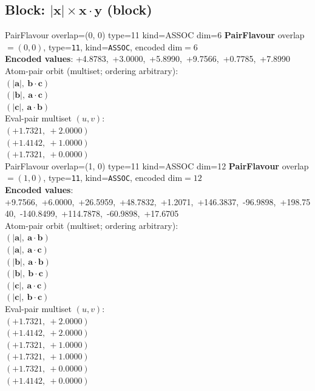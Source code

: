 \documentclass[a4paper,11pt]{article}
\newcommand{\vc}[1]{\ensuremath{\mathbf{#1}}}
\newcommand{\dnfagmiihhiejm}[1]{|\vc{#1}|}
\newcommand{\pdcegfomjfhook}[2]{\mathbf{#1} \cdot \mathbf{#2}}
\begin{document}
\subsection{Block: $\dnfagmiihhiejm{x} \times \pdcegfomjfhook{x}{y}$  (block)}
    PairFlavour  overlap=(0, 0)  type=11  kind=ASSOC  dim=6
\textbf{PairFlavour} overlap$=(0, 0)$, type=\texttt{11}, kind=\texttt{ASSOC}, encoded dim$=6$\\
\textbf{      Encoded values}: +4.8783,\ +3.0000,\ +5.8990,\ +9.7566,\ +0.7785,\ +7.8990\\
\quad Atom-pair orbit (multiset; ordering arbitrary):\\
$(\dnfagmiihhiejm{a},\ \pdcegfomjfhook{b}{c})$\\
$(\dnfagmiihhiejm{b},\ \pdcegfomjfhook{a}{c})$\\
$(\dnfagmiihhiejm{c},\ \pdcegfomjfhook{a}{b})$\\
\quad Eval-pair multiset $(u, v)$:\\
$(+1.7321,\ +2.0000)$\\
$(+1.4142,\ +1.0000)$\\
$(+1.7321,\ +0.0000)$\\
    PairFlavour  overlap=(1, 0)  type=11  kind=ASSOC  dim=12
\textbf{PairFlavour} overlap$=(1, 0)$, type=\texttt{11}, kind=\texttt{ASSOC}, encoded dim$=12$\\
\textbf{      Encoded values}: +9.7566,\ +6.0000,\ +26.5959,\ +48.7832,\ +1.2071,\ +146.3837,\ -96.9898,\ +198.7540,\ -140.8499,\ +114.7878,\ -60.9898,\ +17.6705\\
\quad Atom-pair orbit (multiset; ordering arbitrary):\\
$(\dnfagmiihhiejm{a},\ \pdcegfomjfhook{a}{b})$\\
$(\dnfagmiihhiejm{a},\ \pdcegfomjfhook{a}{c})$\\
$(\dnfagmiihhiejm{b},\ \pdcegfomjfhook{a}{b})$\\
$(\dnfagmiihhiejm{b},\ \pdcegfomjfhook{b}{c})$\\
$(\dnfagmiihhiejm{c},\ \pdcegfomjfhook{a}{c})$\\
$(\dnfagmiihhiejm{c},\ \pdcegfomjfhook{b}{c})$\\
\quad Eval-pair multiset $(u, v)$:\\
$(+1.7321,\ +2.0000)$\\
$(+1.4142,\ +2.0000)$\\
$(+1.7321,\ +1.0000)$\\
$(+1.7321,\ +1.0000)$\\
$(+1.7321,\ +0.0000)$\\
$(+1.4142,\ +0.0000)$\\
\end{document}
